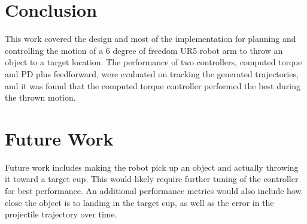 \documentclass[conference]{IEEEtran}
\begin{document}
\section{Conclusion}
This work covered the design and most of the implementation for planning and
controlling the motion of a 6 degree of freedom UR5 robot arm to throw an object
to a target location. The performance of two controllers, computed torque and PD
plus feedforward, were evaluated on tracking the generated trajectories, and it
was found that the computed torque controller performed the best during the
thrown motion.

\section{Future Work}
Future work includes making the robot pick up an object and actually throwing it
toward a target cup. This would likely require further tuning of the controller
for best performance. An additional performance metrics would also include how
close the object is to landing in the target cup, as well as the error in the
projectile trajectory over time.




\end{document}

